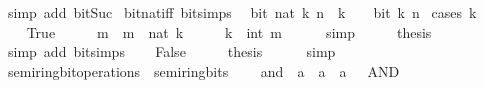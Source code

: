 \begin{isabellebody}
\ {\isacharparenleft}{\kern0pt}simp\ add{\isacharcolon}{\kern0pt}\ bit{\isacharunderscore}{\kern0pt}Suc{\isacharparenright}{\kern0pt}\isanewline
{}\isamarkupfalse%
%
\endisatagproof
{\isafoldproof}%
%
\isadelimproof
\isanewline
%
\endisadelimproof
\isanewline
{}\isamarkupfalse%
\ bit{\isacharunderscore}{\kern0pt}nat{\isacharunderscore}{\kern0pt}iff\ {\isacharbrackleft}{\kern0pt}bit{\isacharunderscore}{\kern0pt}simps{\isacharbrackright}{\kern0pt}{\isacharcolon}{\kern0pt}\isanewline
\ \ {\isacartoucheopen}bit\ {\isacharparenleft}{\kern0pt}nat\ k{\isacharparenright}{\kern0pt}\ n\ {\isasymlongleftrightarrow}\ k\ {\isasymge}\ {}\ {\isasymand}\ bit\ k\ n{\isacartoucheclose}\isanewline
%
\isadelimproof
%
\endisadelimproof
%
\isatagproof
{}\isamarkupfalse%
\ {\isacharparenleft}{\kern0pt}cases\ {\isacartoucheopen}k\ {\isasymge}\ {}{\isacartoucheclose}{\isacharparenright}{\kern0pt}\isanewline
\ \ \isamarkupfalse%
\ True\isanewline
\ \ \isamarkupfalse%
\ \isamarkupfalse%
\ m\ \ {\isacartoucheopen}m\ {\isacharequal}{\kern0pt}\ nat\ k{\isacartoucheclose}\isanewline
\ \ \isamarkupfalse%
\ \isamarkupfalse%
\ {\isacartoucheopen}k\ {\isacharequal}{\kern0pt}\ int\ m{\isacartoucheclose}\isanewline
\ \ \ \ \isamarkupfalse%
\ simp\isanewline
\ \ \isamarkupfalse%
\ \isamarkupfalse%
\ {\isacharquery}{\kern0pt}thesis\isanewline
\ \ \ \ \isamarkupfalse%
\ {\isacharparenleft}{\kern0pt}simp\ add{\isacharcolon}{\kern0pt}\ bit{\isacharunderscore}{\kern0pt}simps{\isacharparenright}{\kern0pt}\isanewline
{}\isamarkupfalse%
\isanewline
\ \ \isamarkupfalse%
\ False\isanewline
\ \ \isamarkupfalse%
\ \isamarkupfalse%
\ {\isacharquery}{\kern0pt}thesis\isanewline
\ \ \ \ \isamarkupfalse%
\ simp\isanewline
{}\isamarkupfalse%
%
\endisatagproof
{\isafoldproof}%
%
\isadelimproof
%
\endisadelimproof
%
\isadelimdocument
%
\endisadelimdocument
%
\isatagdocument
%
\isamarkuptrue%
%
\endisatagdocument
{\isafolddocument}%
%
\isadelimdocument
%
\endisadelimdocument
{}\isamarkupfalse%
\ semiring{\isacharunderscore}{\kern0pt}bit{\isacharunderscore}{\kern0pt}operations\ {\isacharequal}{\kern0pt}\ semiring{\isacharunderscore}{\kern0pt}bits\ {\isacharplus}{\kern0pt}\isanewline
\ \ \ {\isachardoublequoteopen}and{\isachardoublequoteclose}\ {\isacharcolon}{\kern0pt}{\isacharcolon}{\kern0pt}\ {\isacartoucheopen}{\isacharprime}{\kern0pt}a\ {\isasymRightarrow}\ {\isacharprime}{\kern0pt}a\ {\isasymRightarrow}\ {\isacharprime}{\kern0pt}a{\isacartoucheclose}\ \ {\isacharparenleft}{\kern0pt}\ {\isacartoucheopen}AND{\isacartoucheclose}\ {}{}{\isacharparenright}{\kern0pt}\isanewline

\end{isabellebody}
